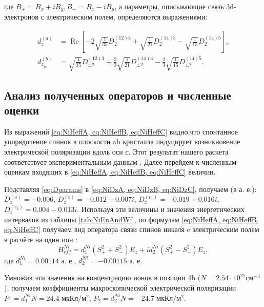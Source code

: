 где $B_{+}=B_{x}+iB_{y}, B_{-}=B_{x}-iB_{y}$, а параметры, описывающие связь 3d-электронов с электрическим полем, определяются выражениями:

\begin{equation}
	\label{eq:CuDz}
	\begin{aligned}
		d_{z}^{(a)}&=\operatorname{Re}\left[-2 \sqrt{\frac{1}{35}} D_{2}^{(12) 3}+\sqrt{\frac{1}{21}} D_{2}^{(14) 3}-\sqrt{\frac{1}{15}} D_{2}^{(14) 5}\right], \\
		d_{z_{\pm}}^{(b)}&=\sqrt{\frac{1}{35}} D_{\pm2}^{(12)3}+\frac{2}{3} \sqrt{\frac{1}{21}} D_{\pm2}^{(14) 3}-\frac{2}{3} \sqrt{\frac{1}{15}} D_{\pm2}^{(14) 5}.
	\end{aligned}
\end{equation}

\subsection{Анализ полученных операторов и численные оценки}\label{subsec:ch2/sec3/sub3}

Из выражений \cref{eq:NiHeffA, eq:NiHeffB, eq:NiHeffC} видно,что спонтанное упорядочение спинов \niIon в плоскости ab кристалла индуцирует возникновение электрической поляризации вдоль оси \textit{с}. Этот результат нашего расчета соответствует экспериментальным данным \cite{Khanh2013}. Далее перейдем к численным оценкам входящих в \cref{eq:NiHeffA, eq:NiHeffB, eq:NiHeffC} величин.

Подставляя \cref{eq:Dparams} в \cref{eq:NiDzA, eq:NiDzB, eq:NiDzC}, получаем (в а. е.): $D_{z}^{(a)}=-0.006$, $D_{z}^{(b)}=-0.012+0.007 i$, $D_{z}^{\left(c_{1}\right)}=-0.019+0.016 i$, $D_{z}^{\left(c_{2}\right)}=0.004-0.013 i$. Используя эти величины и значения энергетических интервалов из таблицы \cref{tab:NiEnAndWf}, по формулам \cref{eq:NiHeffA, eq:NiHeffB, eq:NiHeffC} получаем вид оператора связи спинов никеля c электрическим полем в расчёте на один ион \niIon:
\begin{equation}
	\label{eq:NiHeffSum}
	H_{eff}^{Ni}=d_{1}^{Ni}\left(S_{+}^{2}+S_{-}^{2}\right) E_{z}+i d_{2}^{Ni}\left(S_{+}^{2}-S_{-}^{2}\right) E_{z},
\end{equation}
где $d_{1}^{Ni}=0.00114$ а. е., $d_{2}^{Ni}=-0.00115$ а. е.

Умножив эти значения на концентрацию ионов в позиции 4b ($N\mathop{=}2.54\mathop{\cdot}10^{21} см^{-3}$), получаем коэффициенты макроскопической электрической поляризации $P_{1}=d_{1}^{Ni}N=24.4$ мкКл/м$^{2}$, $P_{2}=d_{2}^{Ni}N=-24.7$ мкКл/м$^{2}$.

